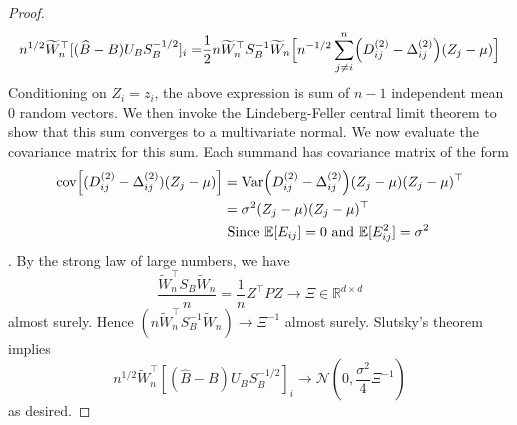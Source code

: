 \begin{proof}
\begin{equation*}
    \begin{split}
        n^{1/2} \tilde{W}_n^\top [(\hat{B} - B) U_B S_B^{-1/2}]_{i} 
         =& \frac{1}{2} n \tilde{W}_n^\top S_B^{-1} \tilde{W}_n \Bigl[n^{-1/2} \sum_{j \neq i}^{n} \Bigl(D^{(2)}_{ij} - \Delta^{(2)}_{ij} \Bigr) (Z_j - \mu)\Bigr] \\  
    \end{split}
    \end{equation*} 
Conditioning on $Z_i = z_i$, the above expression is sum of $n-1$ independent mean $0$ random vectors. We then invoke the Lindeberg-Feller central limit theorem to show that this sum converges to a multivariate normal. We now evaluate the covariance matrix for this sum. Each summand has covariance matrix of the form
\begin{align*}
\mathrm{cov}\Bigl[(D^{(2)}_{ij} - \Delta^{(2)}_{ij} ) (Z_j - {\mu}) \Bigr] 
& = \mathrm{Var}\Bigl( D^{(2)}_{ij} - \Delta^{(2)}_{ij} \Bigr) (Z_j - {\mu}) (Z_j - {\mu})^\top\\
& = \sigma^2  (Z_j - {\mu}) (Z_j - {\mu})^\top \\
& \textrm{ Since } \mathbb{E}[E_{ij}] = 0 \textrm{ and }\mathbb{E}[E_{ij}^2] = \sigma^2
\end{align*}.
By the strong law of large numbers, we have
  $$\frac{\tilde{W}_n^\top S_B \tilde{W}_n}{n} = \frac{1}{n} Z^\top P Z \rightarrow \Xi \in \mathbb{R}^{d \times d}$$ almost surely. Hence $(n \tilde{W}_n^{\top} S_B^{-1} \tilde{W}_n) \rightarrow {\Xi}^{-1}$ almost surely. Slutsky's theorem implies $$ n^{1/2} \tilde{W}_n^\top [(\hat{B} - B) U_B S_B^{-1/2}]_{i} \longrightarrow \mathcal{N}(0, \frac{\sigma^2}{4}{\Xi}^{-1} )$$
  as desired.  
\end{proof} 

